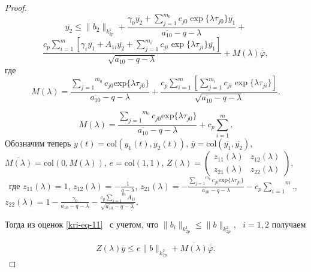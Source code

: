 \begin{proof}
\begin{equation*}
\overline{y_2} \leq \|b_2\|_{k^1_{2p}} + \frac{\gamma_0\overline{y_2}+\sum\limits_{j=1}^{m_0} c_{j0}\exp \{\lambda\tau_{j0} \} \overline{y_1}}{\overline{a_{10}}-q-\lambda} +
\end{equation*}
\begin{equation}\label{kri-eq-11}
\frac{c_p \sum\limits_{i=1}^{m} \left[ \gamma_i\overline{y_1}+A_{1i}\overline{y_2}+\sum\limits_{j=1}^{m_i} c_{ji}\exp\{\lambda\tau_{ji} \} \overline{y_1} \right]}{\sqrt{\overline{a_{10}}-q-\lambda}} + M(\lambda)\overline{\overline{\varphi}},
\end{equation}
где
\begin{equation*}
M(\lambda )=\frac{\overset{m_0}{\underset{j=1}{\sum }}c_{\mathit{j0}}\text{exp}\{\text{$\lambda \tau
		$}_{\mathit{j0}}\}}{\overline{a_{10}}-q-\lambda }+ \frac{c_p \sum\limits_{i=1}^{m}\left[\sum\limits_{j=1}^{m_i} c_{ji}\exp\{\lambda\tau_{ji} \}\right]}{\sqrt{\overline{a_{10}}-q-\lambda}}.
\end{equation*}

\begin{equation*}
M(\lambda )=\frac{\overset{m_0}{\underset{j=1}{\sum }}c_{\mathit{j0}}\text{exp}\{\text{$\lambda \tau
$}_{\mathit{j0}}\}}{\overline{a_{10}}-q-\lambda }+c_p\overset m{\underset{i=1}{\sum }}.
\end{equation*}
Обозначим теперь  $y(t)=\text{col}(y_1(t),y_2(t))$,  $\overline
y=\text{col}(\overline{y_1},\overline{y_2})$,  $\overline{M(\lambda
)}=\text{col}(0,M(\lambda ))$,  $e=\text{col}(1,1)$,  $Z(\lambda
)=\left(\begin{matrix}z_{11}(\lambda )&z_{12}(\lambda )\\z_{21}(\lambda )&z_{22}(\lambda )\end{matrix}\right)$, \ где
$z_{11}(\lambda )=1$,  $z_{12}(\lambda )=-\frac 1{q-\lambda }$,  $z_{21}(\lambda
)=-\frac{\overset{m_0}{\underset{j=1}{\sum }}c_{\mathit{j0}}\text{exp}\{\text{$\lambda \tau
$}_{\mathit{j0}}\}}{\overline{a_{10}}-q-\lambda }-c_p\overset m{\underset{i=1}{\sum }}.$, \  $z_{22}(\lambda
)=1-\frac{\gamma _0}{\overline{a_{10}}-q-\lambda }-\frac{c_p\overset m{\underset{i=1}{\sum
}}A_{1i}}{\sqrt{\overline{a_{10}}-q-\lambda }}.$

Тогда из оценок \eqref{kri-eq-11} \ с учетом, что  $\|b_i\|_{k_{2p}^1}\le \|b\|_{k_{2p}^2},\text{  }i=1,2$ получаем

\begin{equation}\label{kri-eq-12}
	Z(\lambda
	)\overline y\le e\|b\|_{k_{2p}^2}+\overline{M(\lambda )}\overline{\overline{\varphi
	}}.
\end{equation}


\end{proof}
